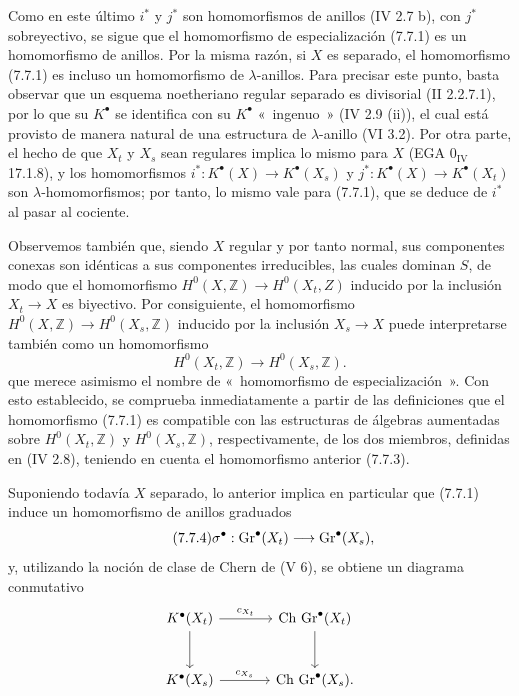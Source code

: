 Como en este último \(i^*\) y \(j^*\) son homomorfismos de anillos (IV 2.7 b), con \(j^*\) sobreyectivo, se sigue que el homomorfismo de especialización (7.7.1) es un homomorfismo de anillos. Por la misma razón, si \(X\) es separado, el homomorfismo (7.7.1) es incluso un homomorfismo de \(\lambda\)-anillos. Para precisar este punto, basta observar que un esquema noetheriano regular separado es divisorial (II 2.2.7.1), por lo que su \(K^\bullet\) se identifica con su \(K^\bullet\) «~ingenuo~» (IV 2.9 (ii)), el cual está provisto de manera natural de una estructura de \(\lambda\)-anillo (VI 3.2). Por otra parte, el hecho de que \(X_t\) y \(X_s\) sean regulares implica lo mismo para \(X\) (EGA \(0_{\mathrm{IV}}\) 17.1.8), y los homomorfismos \(i^*:K^\bullet(X)\to K^\bullet(X_s)\) y \(j^*:K^\bullet(X)\to K^\bullet(X_t)\) son \(\lambda\)-homomorfismos; por tanto, lo mismo vale para (7.7.1), que se deduce de \(i^*\) al pasar al cociente.

Observemos también que, siendo \(X\) regular y por tanto normal, sus componentes conexas son idénticas a sus componentes irreducibles, las cuales dominan \(S\), de modo que el homomorfismo \(H^0(X,\mathbb Z)\to H^0(X_t,Z)\) inducido por la inclusión \(X_t\to X\) es biyectivo. Por consiguiente, el homomorfismo \(H^0(X,\mathbb Z)\to H^0(X_s,\mathbb Z)\) inducido por la inclusión \(X_s\to X\) puede interpretarse también como un homomorfismo
\begin{equation}\tag{7.7.3}
  H^0(X_t,\mathbb Z)\longrightarrow H^0(X_s,\mathbb Z).
\end{equation}
que merece asimismo el nombre de «~homomorfismo de especialización~». Con esto establecido, se comprueba inmediatamente a partir de las definiciones que el homomorfismo (7.7.1) es compatible con las estructuras de álgebras aumentadas sobre \(H^0(X_t,\mathbb Z)\) y \(H^0(X_s,\mathbb Z)\), respectivamente, de los dos miembros, definidas en (IV 2.8), teniendo en cuenta el homomorfismo anterior (7.7.3).

Suponiendo todavía \(X\) separado, lo anterior implica en particular que (7.7.1) induce un homomorfismo de anillos graduados
\begin{equation}\tag{7.7.4}
  \sigma^\bullet:\operatorname{Gr}^\bullet(X_t)\longrightarrow\operatorname{Gr}^\bullet(X_s),
\end{equation}
y, utilizando la noción de clase de Chern de (V 6), se obtiene un diagrama conmutativo
\[
\begin{tikzcd}[column sep=large,row sep=large]
K^\bullet(X_t) \arrow[r,"c_{X_t}"] \arrow[d] &
\Ch\,\Gr^\bullet(X_t) \arrow[d]\\
K^\bullet(X_s) \arrow[r,"c_{X_s}"] &
\Ch\,\Gr^\bullet(X_s).
\end{tikzcd}
\]

